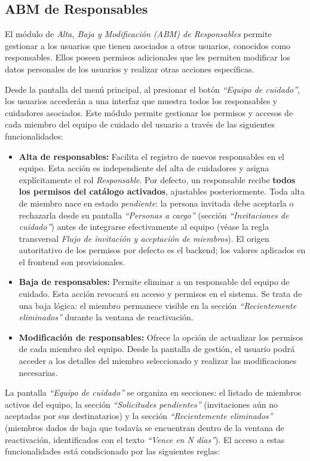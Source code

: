 \documentclass[a4paper,12pt]{article}
\begin{document}
    \subsection{ABM de Responsables}
    \par El módulo de \textit{Alta, Baja y Modificación (ABM) de Responsables} permite gestionar a los usuarios que tienen asociados a otros usuarios, conocidos como responsables. Ellos poseen permisos adicionales que les permiten modificar los datos personales de los usuarios y realizar otras acciones específicas.
    \par Desde la pantalla del menú principal, al presionar el botón \textit{``Equipo de cuidado''}, los usuarios accederán a una interfaz que muestra todos los responsables y cuidadores asociados. Este módulo permite gestionar los permisos y accesos de cada miembro del equipo de cuidado del usuario a través de las siguientes funcionalidades:
    \begin{itemize}
        \item \textbf{Alta de responsables:} Facilita el registro de nuevos responsables en el equipo. Esta acción es independiente del alta de cuidadores y asigna explícitamente el rol \textit{Responsable}. Por defecto, un responsable recibe \textbf{todos los permisos del catálogo activados}, ajustables posteriormente. Toda alta de miembro nace en estado \textit{pendiente}: la persona invitada debe aceptarla o rechazarla desde su pantalla \textit{``Personas a cargo''} (sección \textit{``Invitaciones de cuidado''}) antes de integrarse efectivamente al equipo (véase la regla transversal \textit{Flujo de invitación y aceptación de miembros}). El origen autoritativo de los permisos por defecto es el backend; los valores aplicados en el frontend son provisionales.
        \item \textbf{Baja de responsables:} Permite eliminar a un responsable del equipo de cuidado. Esta acción revocará su acceso y permisos en el sistema. Se trata de una baja lógica: el miembro permanece visible en la sección \textit{``Recientemente eliminados''} durante la ventana de reactivación.
        \item \textbf{Modificación de responsables:} Ofrece la opción de actualizar los permisos de cada miembro del equipo. Desde la pantalla de gestión, el usuario podrá acceder a los detalles del miembro seleccionado y realizar las modificaciones necesarias.
    \end{itemize}
    \par La pantalla \textit{``Equipo de cuidado''} se organiza en secciones: el listado de miembros activos del equipo, la sección \textit{``Solicitudes pendientes''} (invitaciones aún no aceptadas por sus destinatarios) y la sección \textit{``Recientemente eliminados''} (miembros dados de baja que todavía se encuentran dentro de la ventana de reactivación, identificados con el texto \textit{“Vence en N días”}). El acceso a estas funcionalidades está condicionado por las siguientes reglas:
\end{document}
